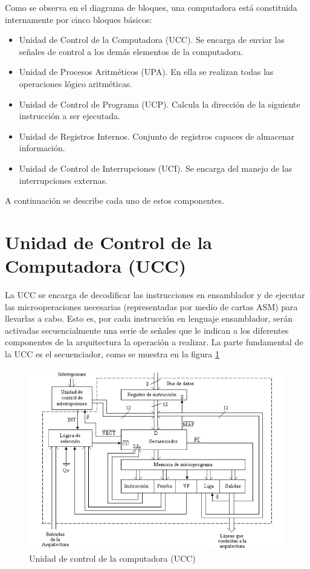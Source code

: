 \documentclass[12pt]{book}
\theoremstyle{definition}
\theoremstyle{remark}
\theoremstyle{plain}
\begin{document}
Como se observa en el diagrama de bloques, una computadora está constituida internamente por
cinco bloques básicos:

\begin{itemize}
\item Unidad de Control de la Computadora (UCC). Se encarga de enviar las señales de control a
los demás elementos de la computadora.
\item Unidad de Procesos Aritméticos (UPA). En ella se realizan todas las operaciones lógico
aritméticas.
\item Unidad de Control de Programa (UCP). Calcula la dirección de la siguiente instrucción a ser
ejecutada.
\item Unidad de Registros Internos. Conjunto de registros capaces de almacenar información.
\item Unidad de Control de Interrupciones (UCI). Se encarga del manejo de las interrupciones
externas.
\end{itemize}

A continuación se describe cada uno de estos componentes.

\section{Unidad de Control de la Computadora (UCC)}

La UCC se encarga de decodificar las instrucciones en ensamblador y de ejecutar las microoperaciones
necesarias (representadas por medio de cartas ASM) para llevarlas a cabo. Esto es, por
cada instrucción en lenguaje ensamblador, serán activadas secuencialmente una serie de señales que
le indican a los diferentes componentes de la arquitectura la operación a realizar. La parte
fundamental de la UCC es el secuenciador, como se muestra en la figura \ref{fig30}

\begin{figure}
\centering
\includegraphics[width=5in]{UCC.jpg}
\caption{Unidad de control de la computadora (UCC)}
\label{fig30}
\end{figure}
\end{document}
